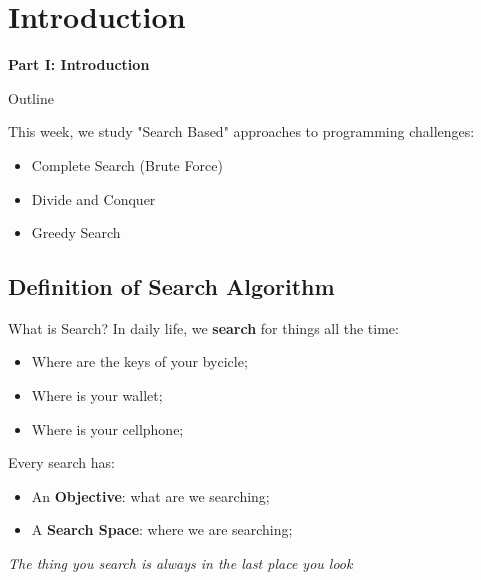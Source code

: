 \section{Introduction}

\begin{frame}{}{}
  \begin{center}
    {\bf Part I: Introduction}
  \end{center}
\end{frame}




\begin{frame}{Outline}

  This week, we study "Search Based" approaches to programming challenges:
  \bigskip

  \begin{itemize}
    \item Complete Search (Brute Force)\bigskip

    \item Divide and Conquer\bigskip

    \item Greedy Search\bigskip
  \end{itemize}
\end{frame}


\subsection{Definition of Search Algorithm}
\begin{frame}{What is Search?}
  In daily life, we {\bf search} for things all the time:

  \begin{itemize}
  \item Where are the keys of your bycicle;
  \item Where is your wallet;
  \item Where is your cellphone;
  \end{itemize}\medskip

  Every search has:
  \begin{itemize}
    \item An {\bf Objective}: what are we searching;
    \item A {\bf Search Space}: where we are searching;
  \end{itemize}

  \begin{block}{}
    {\smaller
    \hfill \emph{The thing you search is always in the last place you look}}
  \end{block}
\end{frame}

